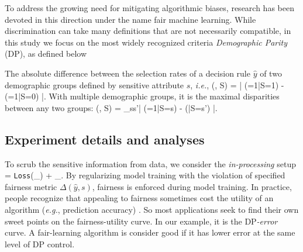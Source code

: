 \documentclass{article}
\theoremstyle{plain}
\theoremstyle{definition}
\theoremstyle{remark}
\newcommand{\DP}{\text{DP}}
\begin{document}
			To address the growing need for mitigating algorithmic biases, research has been devoted in this direction under the name fair machine learning. While discrimination can take many definitions that are not necessarily compatible, in this study we focus on the most widely recognized  criteria {\it Demographic Parity} (DP), as defined below
			
			\begin{defn}
				The absolute difference between the selection rates of a decision rule $\hat{y}$ of two demographic groups defined by sensitive attribute $s$, {\it i.e.}, 
				\beq
				\DP(, S) = \left| \PP(\hat{Y}=1|S=1) - \PP(=1|S=0) \right|.
				\eeq
				With multiple demographic groups, it is the maximal disparities between any two groups:
				\beq
				\DP(, S) = \max_{s\neq s'}\left| \PP(\hat{Y}=1|S=s) - \PP(|S=s') \right|.
				\eeq
			\end{defn}
			
			\subsection{Experiment details and analyses}
			
			To scrub the sensitive information from data, we consider the {\it in-processing} setup 
			\beq
			\CL = \texttt{Loss}(_{}) + \lambda {}_{}.
			\eeq
			By regularizing model training with the violation of specified fairness metric $\Delta(\hat{y}, s)$, fairness is enforced during model training. In practice, people recognize that appealing to fairness sometimes cost the utility of an algorithm ({\it e.g.}, prediction accuracy) \citep{hardt2016equality}. So most applications seek to find their own sweet points on the fairness-utility curve. In our example, it is the {\it $\DP$-error} curve. A fair-learning algorithm is consider good if it has lower error at the same level of DP control. 
			
			
			
\end{document}

